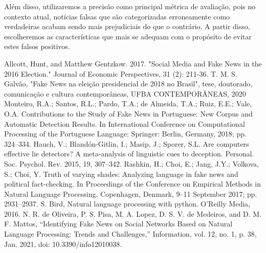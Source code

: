 \documentclass[conference]{IEEEtran}
\begin{document}
Além disso, utilizaremos a precisão como principal métrica de avaliação, pois no contexto atual, notícias falsas que são categorizadas erroneamente como verdadeiras acabam sendo mais prejudiciais do que o contrário. A partir disso, escolheremos as características que mais se adequam com o propósito de evitar estes falsos positivos.


\begin{thebibliography}{00}
 Allcott, Hunt, and Matthew Gentzkow. 2017. "Social Media and Fake News in the 2016 Election." Journal of Economic Perspectives, 31 (2): 211-36.
 T. M. S. Galvão, "Fake News na eleição presidencial de 2018 no Brasil", tese, doutorado, comunicação e cultura contemporâneas, UFBA
CONTEMPORÂNEAS, 2020
 Monteiro, R.A.; Santos, R.L.; Pardo, T.A.; de Almeida, T.A.; Ruiz, E.E.; Vale, O.A. Contributions to the Study of Fake News in
Portuguese: New Corpus and Automatic Detection Results. In International Conference on Computational Processing of the Portuguese
Language; Springer: Berlin, Germany, 2018; pp. 324–334.
 Hauch, V.; Blandón-Gitlin, I.; Masip, J.; Sporer, S.L. Are computers effective lie detectors? A meta-analysis of linguistic cues to
deception. Personal. Soc. Psychol. Rev. 2015, 19, 307–342.
 Rashkin, H.; Choi, E.; Jang, J.Y.; Volkova, S.; Choi, Y. Truth of varying shades: Analyzing language in fake news and political
fact-checking. In Proceedings of the Conference on Empirical Methods in Natural Language Processing, Copenhagen, Denmark,
9–11 September 2017; pp. 2931–2937.
 S. Bird, Natural language processing with python. O'Reilly Media, 2016. 
 N. R. de Oliveira, P. S. Pisa, M. A. Lopez, D. S. V. de Medeiros, and D. M. F. Mattos, “Identifying Fake News on Social Networks Based on Natural Language Processing: Trends and Challenges,” Information, vol. 12, no. 1, p. 38, Jan. 2021, doi: 10.3390/info12010038.
\end{thebibliography}
\vspace{12pt}
\color{red}
\end{document}
